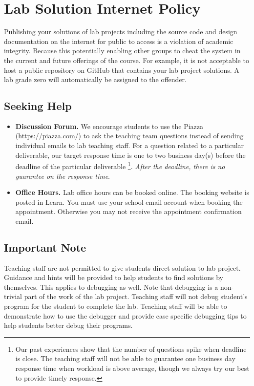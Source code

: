 \section*{Lab Solution Internet Policy} 
Publishing your solutions of lab projects including the source code and design documentation 
on the internet for public to access is a violation of academic integrity. Because this potentially enabling other groups to cheat the system in the current and future offerings of the course. For example, it is not acceptable to host a public repository on GitHub that contains your lab project solutions. A lab grade zero will automatically be assigned to the offender. 
 
\subsection*{Seeking Help}
\begin{itemize}
    \item{\bf Discussion Forum.}
        We encourage students to use the Piazza (\url{https://piazza.com/})
        to ask the teaching team questions instead of sending individual emails to lab teaching staff.
        For a question related to a particular deliverable, our target response time is
        one to two business day(s) before the deadline of the particular deliverable
        \footnote{Our past experiences show that the number of questions spike when deadline is close.
            The teaching staff will not be able to guarantee one business day response time when workload is
            above average, though we always try our best to provide timely response.}. 
        {\em After the deadline, there is no guarantee on the response time}.
    \item{\bf Office Hours.} 
        Lab office hours can be booked online. The booking website is posted in Learn. You must use your school email account when booking the appointment. Otherwise you may not receive the appointment confirmation email.
\end{itemize}
\subsection*{Important Note}
  Teaching staff are not permitted to give students direct solution to lab project. Guidance and hints will be provided to help students to find solutions by themselves. This applies to debugging as well. Note that debugging is a non-trivial part of the work of the lab project. Teaching staff will not debug student's program for the student to complete the lab. Teaching staff will be able to demonstrate how to use the debugger and provide case specific debugging tips to help students better debug their programs.

